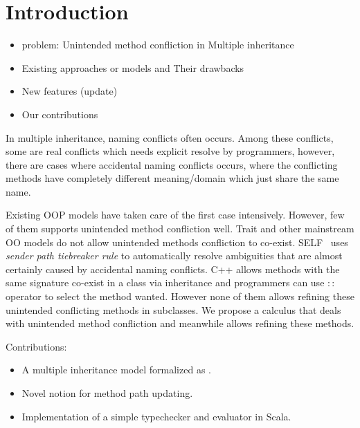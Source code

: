 \section{Introduction}

\begin{itemize}
	\item problem: Unintended method confliction in Multiple inheritance
	\item Existing approaches or models and Their drawbacks
	\item New features (update)
	\item Our contributions
\end{itemize}

In multiple inheritance, naming conflicts often occurs. Among these conflicts, some are real conflicts which needs 
explicit resolve by programmers, however, there are cases where accidental naming conflicts occurs, where the conflicting
methods have completely different meaning/domain which just share the same name. 

Existing OOP models have taken care of the first case intensively. However, few of them supports 
unintended method confliction well. Trait and other 
mainstream OO models do not allow unintended methods confliction to co-exist. 
SELF~\cite{} uses \emph{sender path tiebreaker rule} to automatically resolve 
ambiguities that are almost certainly caused by accidental naming conflicts. C++ allows methods with the same signature 
co-exist in a class via inheritance and programmers can use $::$ operator to select the method wanted. 
However none of them allows refining these unintended conflicting methods in subclasses. We propose a calculus that 
deals with unintended method confliction and meanwhile allows refining these methods. 

Contributions:
\begin{itemize}
    \item A multiple inheritance model formalized as \MIM.
    \item Novel notion \updates for method path updating.
    \item Implementation of a simple typechecker and evaluator in Scala.
\end{itemize}